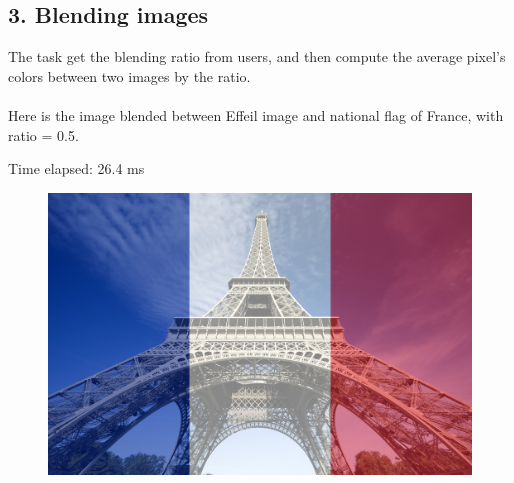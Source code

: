 \documentclass[12pt]{article}
\begin{document}
\subsection*{3. Blending images}

The task get the blending ratio from users, and then compute the average pixel's colors between two images by the ratio.
\\\\
Here is the image blended between Effeil image and national flag of France, with ratio = 0.5.

Time elapsed: 26.4 ms

\begin{figure}[H]
  \centering
  \includegraphics[width=0.7\linewidth]{./img/6c.jpg}
\end{figure}
\end{document}
